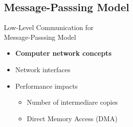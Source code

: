 	\subsection{Message-Passsing Model}

		\begin{frame}[fragile]{Low-Level Communication for\\Message-Passsing Model}
			\begin{itemize}
				\item \textbf{Computer network concepts}
				\item Network interfaces
				\item Performance impacts
				\begin{itemize}
					\item Number of intermediare copies
					\item Direct Memory Access (DMA)
				\end{itemize}
			\end{itemize}

		\end{frame}

